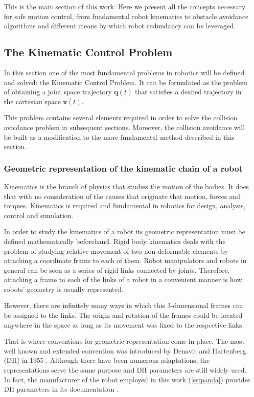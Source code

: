 This is the main section of this work. Here we present all the concepts necessary for safe motion control, from fundamental robot kinematics to obstacle avoidance algorithms and different means by which robot redundancy can be leveraged.

\subsection{The Kinematic Control Problem}
\label{ss:kinematiccontrol}
In this section one of the most fundamental problems in robotics will be defined and solved: the Kinematic Control Problem. It can be formulated as the problem of obtaining a joint space trajectory $\mathbf{q}(t)$ that satisfies a desired trajectory in the cartesian space $\mathbf{x}(t)$.

This problem contains several elements required in order to solve the collision avoidance problem in subsequent sections. Moreover, the collision avoidance will be built as a modification to the more fundamental method described in this section.

\subsubsection{Geometric representation of the kinematic chain of a robot}
\label{sss:geomrep}

Kinematics is the branch of physics that studies the motion of the bodies. It does that with no consideration of the causes that originate that motion, forces and torques. Kinematics is required and fundamental in robotics for design, analysis, control and simulation.

In order to study the kinematics of a robot its geometric representation must be defined mathematically beforehand. Rigid body kinematics deals with the problem of studying relative movement of two non-deformable elements by attaching a coordinate frame to each of them. Robot manipulators and robots in general can be seen as a series of rigid links connected by joints. Therefore, attaching a frame to each of the links of a robot in a convenient manner is how robots' geometry is usually represented.

However, there are infinitely many ways in which this 3-dimensional frames can be assigned to the links. The origin and rotation of the frames could be located anywhere in the space as long as its movement was fixed to the respective links.

That is where conventions for geometric representation come in place. The most well known and extended convention was introduced by Denavit and Hartenberg (DH) in 1955 \cite{hartenberg1955kinematic}. Although there have been numerous adaptations, the representations serve the same purpose and DH parameters are still widely used. In fact, the manufacturer of the robot employed in this work (\ref{ss:panda}) provides DH parameters in its documentation \cite{FrankaEmikaPanda}.

